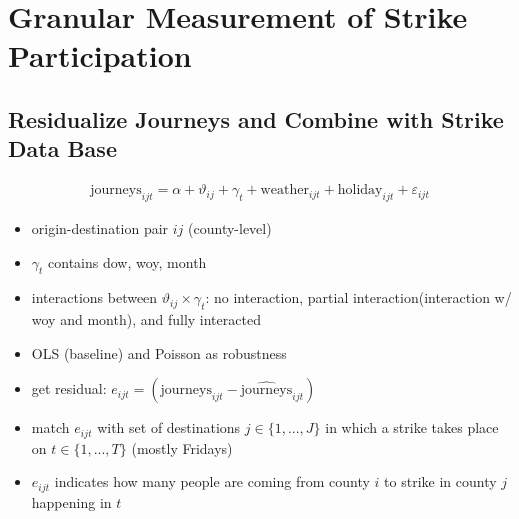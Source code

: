 \newpage
\section{Granular Measurement of Strike Participation}\label{sec_greta_cons:measurement_strike_participation}


\subsection{Residualize Journeys and Combine with Strike Data Base}
\begin{align}
	\text{journeys}_{ijt} = \alpha + \vartheta_{ij} + \gamma_t + \text{weather}_{ijt} + \text{holiday}_{ijt} + \varepsilon_{ijt} \label{eq_greta_cons:res_journeys}
\end{align}

\begin{itemize}
	\item origin-destination pair $ij$ (county-level)
	\item $\gamma_t$ contains dow, woy, month
	\item interactions between $\vartheta_{ij} \times \gamma_t$: no interaction, partial interaction(interaction w/ woy and month), and fully interacted
	\item OLS (baseline) and Poisson as robustness 
	\item get residual: $e_{ijt} =(\text{journeys}_{ijt} - \widehat{\text{journeys}}_{ijt})$
	\item match $e_{ijt}$ with set of destinations $j\in\{1,...,J\}$ in which a strike takes place on $t\in\{1,...,T\}$ (mostly Fridays)
	\item $e_{ijt}$ indicates how many people are coming from county $i$ to strike in county $j$ happening in $t$
\end{itemize}



